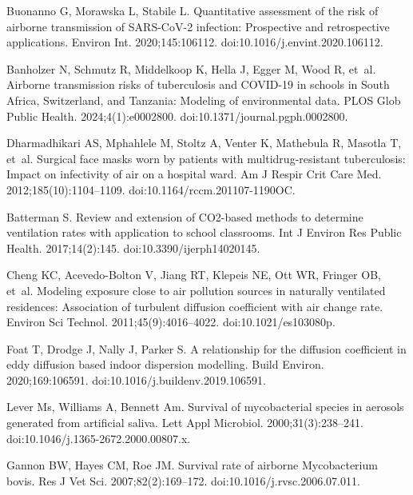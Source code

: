 \documentclass[fleqn,11pt]{wlscirep}
\begin{document}
\begin{thebibliography}{10}
Buonanno G, Morawska L, Stabile L.
\newblock Quantitative assessment of the risk of airborne transmission of
  {SARS}-{CoV}-2 infection: {Prospective} and retrospective applications.
\newblock Environ Int. 2020;145:106112.
\newblock doi:10.1016/j.envint.2020.106112.

Banholzer N, Schmutz R, Middelkoop K, Hella J, Egger M, Wood R, et~al.
\newblock Airborne transmission risks of tuberculosis and {COVID}-19 in schools
  in {South} {Africa}, {Switzerland}, and {Tanzania}: {Modeling} of
  environmental data.
\newblock PLOS Glob Public Health. 2024;4(1):e0002800.
\newblock doi:10.1371/journal.pgph.0002800.

Dharmadhikari AS, Mphahlele M, Stoltz A, Venter K, Mathebula R, Masotla T,
  et~al.
\newblock Surgical face masks worn by patients with multidrug-resistant
  tuberculosis: {Impact} on infectivity of air on a hospital ward.
\newblock Am J Respir Crit Care Med. 2012;185(10):1104--1109.
\newblock doi:10.1164/rccm.201107-1190OC.

Batterman S.
\newblock Review and extension of {CO2}-based methods to determine ventilation
  rates with application to school classrooms.
\newblock Int J Environ Res Public Health. 2017;14(2):145.
\newblock doi:10.3390/ijerph14020145.

Cheng KC, Acevedo-Bolton V, Jiang RT, Klepeis NE, Ott WR, Fringer OB, et~al.
\newblock Modeling exposure close to air pollution sources in naturally
  ventilated residences: {Association} of turbulent diffusion coefficient with
  air change rate.
\newblock Environ Sci Technol. 2011;45(9):4016--4022.
\newblock doi:10.1021/es103080p.

Foat T, Drodge J, Nally J, Parker S.
\newblock A relationship for the diffusion coefficient in eddy diffusion based
  indoor dispersion modelling.
\newblock Build Environ. 2020;169:106591.
\newblock doi:10.1016/j.buildenv.2019.106591.

Lever Ms, Williams A, Bennett Am.
\newblock Survival of mycobacterial species in aerosols generated from
  artificial saliva.
\newblock Lett Appl Microbiol. 2000;31(3):238--241.
\newblock doi:10.1046/j.1365-2672.2000.00807.x.

Gannon BW, Hayes CM, Roe JM.
\newblock Survival rate of airborne {Mycobacterium} bovis.
\newblock Res J Vet Sci. 2007;82(2):169--172.
\newblock doi:10.1016/j.rvsc.2006.07.011.


\end{thebibliography}
\end{document}
